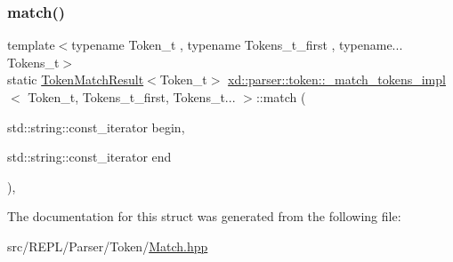 \subsubsection{\texorpdfstring{match()}{match()}}
{\footnotesize\ttfamily template$<$typename Token\+\_\+t , typename Tokens\+\_\+t\+\_\+first , typename... Tokens\+\_\+t$>$ \\
static \mbox{\hyperlink{namespacexd_1_1parser_1_1token_a766c52bbfb7cb1f08498ef0bb9ec756e}{Token\+Match\+Result}}$<$Token\+\_\+t$>$ \mbox{\hyperlink{structxd_1_1parser_1_1token_1_1__match__tokens__impl}{xd\+::parser\+::token\+::\+\_\+match\+\_\+tokens\+\_\+impl}}$<$ Token\+\_\+t, Tokens\+\_\+t\+\_\+first, Tokens\+\_\+t... $>$\+::match (\begin{DoxyParamCaption}\item[{std\+::string\+::const\+\_\+iterator}]{begin,  }\item[{std\+::string\+::const\+\_\+iterator}]{end }\end{DoxyParamCaption})\hspace{0.3cm}{\ttfamily [inline]}, {\ttfamily [static]}}



The documentation for this struct was generated from the following file\+:\begin{DoxyCompactItemize}
\item 
src/\+R\+E\+P\+L/\+Parser/\+Token/\mbox{\hyperlink{_parser_2_token_2_match_8hpp}{Match.\+hpp}}\end{DoxyCompactItemize}
